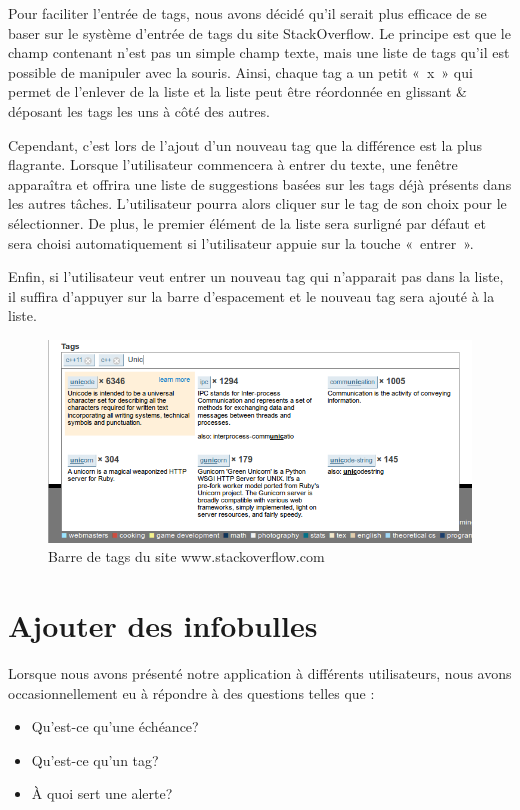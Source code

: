 \documentclass[letterpaper, oneside, 12pt, these, creativecommons]{thETS}
\begin{document}
Pour faciliter l'entrée de tags, nous avons décidé qu'il serait plus efficace de se baser sur le système d'entrée de tags du site StackOverflow. Le principe est que le champ contenant n'est pas un simple champ texte, mais une liste de tags qu'il est possible de manipuler avec la souris. Ainsi, chaque tag a un petit « x » qui permet de l'enlever de la liste et la liste peut être réordonnée en glissant \& déposant les tags les uns à côté des autres.

Cependant, c'est lors de l'ajout d'un nouveau tag que la différence est la plus flagrante. Lorsque l'utilisateur commencera à entrer du texte, une fenêtre apparaîtra et offrira une liste de suggestions basées sur les tags déjà présents dans les autres tâches. L'utilisateur pourra alors cliquer sur le tag de son choix pour le sélectionner. De plus, le premier élément de la liste sera surligné par défaut et sera choisi automatiquement si l'utilisateur appuie sur la touche « entrer ».

Enfin, si l'utilisateur veut entrer un nouveau tag qui n'apparait pas dans la liste, il suffira d'appuyer sur la barre d'espacement et le nouveau tag sera ajouté à la liste.

\begin{figure}
    \includegraphics[scale=0.5]{tags_stackoverflow.png}
    \caption{Barre de tags du site www.stackoverflow.com}
\end{figure}

\section{Ajouter des infobulles}

Lorsque nous avons présenté notre application à différents utilisateurs, nous avons occasionnellement eu à répondre à des questions telles que :

\begin{itemize}
    \item Qu'est-ce qu'une échéance?
    \item Qu'est-ce qu'un tag?
    \item À quoi sert une alerte?
\end{itemize}
\end{document}
